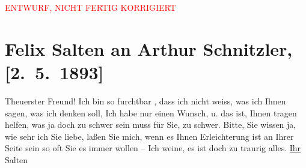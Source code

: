 
\begin{center}
            \textcolor{red}{ENTWURF, NICHT FERTIG KORRIGIERT}
                      \end{center}
            
         
         \renewcommand{\erwaehntePersonen}{Personen: Johann Schnitzler}
         \renewcommand{\erwaehnteOrte}{Orte: Wien}
         \renewcommand{\erwaehnteWerke}{}
               \section[Felix Salten an Arthur Schnitzler, {[}2. 5. 1893{]}]{ Felix Salten an Arthur Schnitzler, {[}2. 5. 1893{]}}\nopagebreak{}\rehead{ }\begin{ledgroupsized}[t]{13cm}\normalsize\beginnumbering \toendnotes[C]{\smallbreak\pagebreak[2]} 
\toendnotes[C]{\smallbreak}\pstart
           \noindent{}{\pb}Theuerster Freund! Ich bin so furchtbar \label{K_L03122-1v}\label{K_L03122-1h}, dass ich nicht weiss, was ich
               Ihnen sagen, was ich denken soll, Ich habe nur einen Wunsch, u. das ist, Ihnen tragen
               helfen, was ja doch {\pb}zu schwer
               sein muss für Sie, zu schwer. Bitte, Sie wissen ja, wie sehr ich Sie liebe, laßen Sie
               mich, wenn es Ihnen Erleichterung ist an Ihrer Seite sein so oft Sie es immer wollen
               – \pend
           \pstart
           Ich weine, es ist doch zu traurig alles.\pend
           \pstart \uline{Ihr}{ }\spacefill\mbox{Salten}\pend{}
         
         \endnumbering{}\end{ledgroupsized}\begin{anhang}\end{anhang}\newcommand{\dateiname}{L03122}\newcommand{\titel}{Felix Salten an Arthur Schnitzler, [2. 5. 1893]}\newcommand{\editorInnen}{Martin Anton Müller und Laura Untner}
      